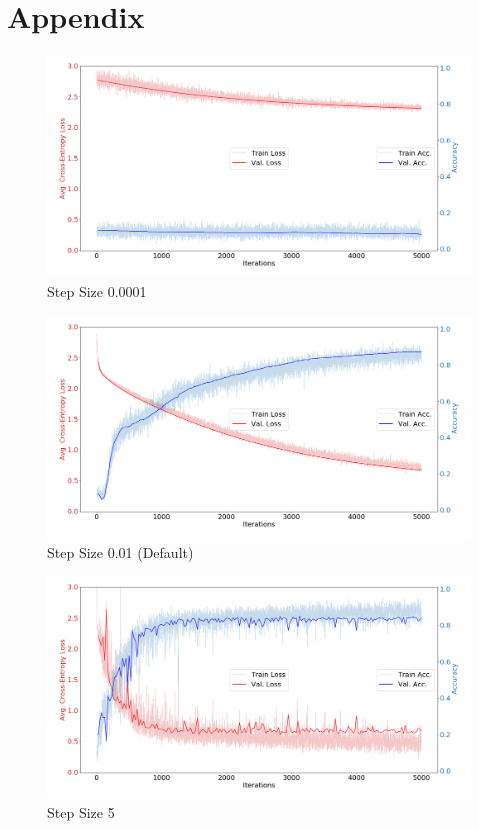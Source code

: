 \documentclass{article}
\begin{document}
    \section*{Appendix}
        \begin{figure}[h]
            \includegraphics[width=\textwidth]{"SS_0001.png"}
            \caption{Step Size 0.0001}
        \end{figure}
        \begin{figure}[h!]
            \includegraphics[width=\textwidth]{"SS_01.png"}
            \caption{Step Size 0.01 (Default)}
        \end{figure}
        \begin{figure}[t]
            \includegraphics[width=\textwidth]{"SS_5.png"}
            \caption{Step Size 5}
        \end{figure}
\end{document}

